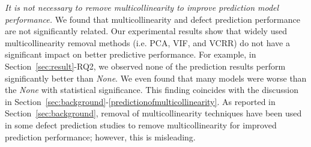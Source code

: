 \emph{It is not necessary to remove multicollinearity to improve prediction model performance.}
We found that multicollinearity and defect prediction performance are not significantly related. %
Our experimental results show that widely used multicollinearity removal methods (i.e. PCA, VIF, and VCRR) do not have a significant impact on better predictive performance. For example, in Section~\ref{sec:result}-RQ2, we observed none of the prediction results perform significantly better than \emph{None}. We even found that many models were worse than the \emph{None} with statistical significance. 
This finding coincides with the discussion in Section~\ref{sec:background}-\ref{predictionofmulticollinearity}. As reported in Section~\ref{sec:background}, removal of multicollinearity techniques have been used in some defect prediction studies to remove multicollinearity for improved prediction performance; however, this is misleading.

